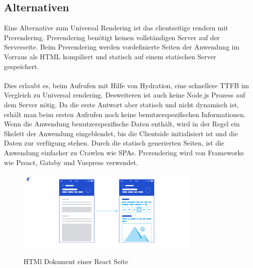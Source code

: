 \documentclass[runningheads]{llncs}
\begin{document}
\subsection{Alternativen}
\label{subsec:Alternativen}
Eine Alternative zum Universal Rendering ist das clientseitige rendern mit Prerendering. 
Prerendering benötigt keinen vollständigen Server auf der Serverseite. 
Beim Prerendering werden vordefinierte Seiten der Anwendung im Vorraus als HTML kompiliert und 
statisch auf einem statischen Server gespeichert. 
\\
\\
Dies erlaubt es, beim Aufrufen mit Hilfe von Hydration, 
eine schnellere TTFB im Vergleich zu Universal rendering. 
Desweiteren ist auch keine Node.js Prozess auf dem Server nötig. 
Da die erste Antwort aber statisch und nicht dynamisch ist, 
erhält man beim ersten Aufrufen noch keine benutzerspezifischen Informationen. 
Wenn die Anwendung benutzerspezifische Daten enthält, 
wird in der Regel ein Skelett der Anwendung eingeblendet, 
bis die Clientside initialisiert ist und die Daten zur verfügung stehen. 
Durch die statisch generierten Seiten, 
ist die Anwendung einfacher zu Crawlen wie SPAs. 
Prerendering wird von Frameworks wie Preact, 
Gatsby und Vuepress verwendet.

\begin{figure}[h]
  \centering
  \includegraphics[width=9cm]{images/WebsiteSceleton}
  \caption{HTMl Dokument einer React Seite}
  \cite{breux_2018}
\end{figure}
\end{document}
